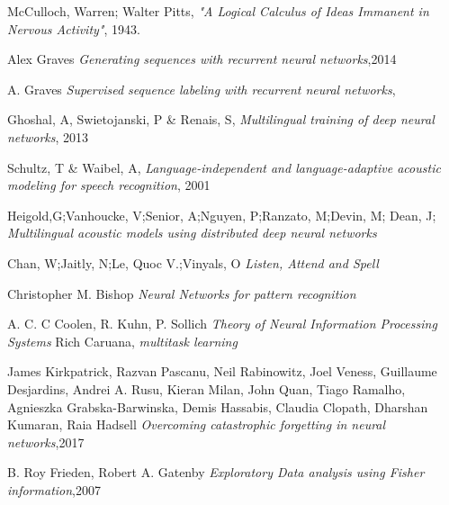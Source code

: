 \documentclass[a4paper]{article}
\begin{document}
\begin{thebibliography}{9}
  McCulloch, Warren; Walter Pitts,
  \emph{"A Logical Calculus of Ideas Immanent in Nervous Activity"},
  1943.
  
  Alex Graves \emph{Generating sequences with recurrent neural networks},2014

 A. Graves \emph{Supervised sequence labeling with recurrent neural networks},
  
  Ghoshal, A, Swietojanski, P \& Renais, S, \emph{Multilingual training of deep neural networks}, 2013
  
  Schultz, T \& Waibel, A, \emph{Language-independent and language-adaptive acoustic modeling for speech recognition}, 2001

 Heigold,G;Vanhoucke, V;Senior, A;Nguyen, P;Ranzato, M;Devin, M; Dean, J; \emph{Multilingual acoustic models using distributed deep neural networks}

 Chan, W;Jaitly, N;Le, Quoc V.;Vinyals, O \emph{Listen, Attend and Spell}
 
 Christopher M. Bishop \emph{Neural Networks for pattern recognition}
 
A. C. C Coolen, R. Kuhn, P. Sollich \emph{Theory of Neural Information Processing Systems}
 Rich Caruana, \emph{multitask learning}

James Kirkpatrick, Razvan Pascanu, Neil Rabinowitz, Joel Veness, Guillaume Desjardins, Andrei A. Rusu, Kieran Milan, John Quan, Tiago Ramalho, Agnieszka Grabska-Barwinska, Demis Hassabis, Claudia Clopath, Dharshan Kumaran, Raia Hadsell \emph{Overcoming catastrophic forgetting in neural networks},2017

B. Roy Frieden, Robert A. Gatenby \emph{Exploratory Data analysis using Fisher information},2007
 

 
 
\end{thebibliography}
\end{document}
